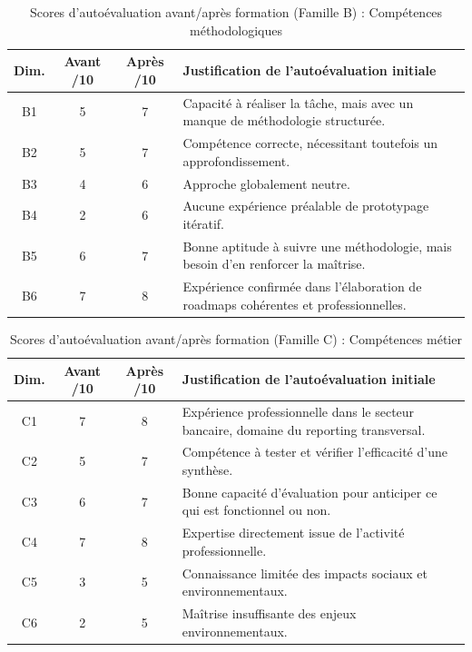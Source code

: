 \begin{table}[h!]
  \centering
  \caption{Scores d'autoévaluation avant/après formation (Famille B) : Compétences méthodologiques}
  \label{tab:7.scores-famille-b}
  \smallskip
  \begin{tabularx}{\textwidth}{@{} c c c X @{}}
    \toprule
    \textbf{Dim.} & \textbf{Avant /10} & \textbf{Après /10} & \textbf{Justification de l'autoévaluation initiale} \\
    \midrule
    B1 & 5 & 7 & Capacité à réaliser la tâche, mais avec un manque de méthodologie structurée. \\
    B2 & 5 & 7 & Compétence correcte, nécessitant toutefois un approfondissement. \\
    B3 & 4 & 6 & Approche globalement neutre. \\
    B4 & 2 & 6 & Aucune expérience préalable de prototypage itératif. \\
    B5 & 6 & 7 & Bonne aptitude à suivre une méthodologie, mais besoin d'en renforcer la maîtrise. \\
    B6 & 7 & 8 & Expérience confirmée dans l'élaboration de roadmaps cohérentes et professionnelles. \\
    \bottomrule
  \end{tabularx}
\end{table}

\begin{table}[h!]
  \centering
  \caption{Scores d'autoévaluation avant/après formation (Famille C) : Compétences métier}
  \label{tab:7.scores-famille-c}
  \smallskip
  \begin{tabularx}{\textwidth}{@{} c c c X @{}}
    \toprule
    \textbf{Dim.} & \textbf{Avant /10} & \textbf{Après /10} & \textbf{Justification de l'autoévaluation initiale} \\
    \midrule
    C1 & 7 & 8 & Expérience professionnelle dans le secteur bancaire, domaine du reporting transversal. \\
    C2 & 5 & 7 & Compétence à tester et vérifier l'efficacité d'une synthèse. \\
    C3 & 6 & 7 & Bonne capacité d'évaluation pour anticiper ce qui est fonctionnel ou non. \\
    C4 & 7 & 8 & Expertise directement issue de l'activité professionnelle. \\
    C5 & 3 & 5 & Connaissance limitée des impacts sociaux et environnementaux. \\
    C6 & 2 & 5 & Maîtrise insuffisante des enjeux environnementaux. \\
    \bottomrule
  \end{tabularx}
\end{table}

\clearpage
\ClearShipoutPictureBG
